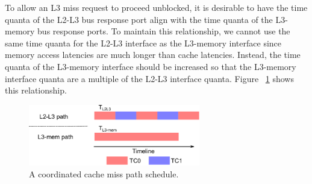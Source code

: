 To allow an L3 miss request to proceed unblocked, it is desirable to have the time 
quanta of the L2-L3 bus response port align with the time quanta of the 
L3-memory bus response ports. To maintain this relationship, we cannot use the 
same time quanta for the L2-L3 interface as the L3-memory interface since 
memory access latencies are much longer than cache latencies. Instead, the time 
quanta of the L3-memory interface should be increased so that the L3-memory 
interface quanta are a multiple of the L2-L3 interface quanta. Figure 
~\ref{fig:coordination} shows this relationship.


\begin{figure}
    \begin{center}
        \includegraphics[width=2.9475in]{figs/coordination.eps}
        \caption{A coordinated cache miss path schedule.}
        \label{fig:coordination}
    \end{center}
\end{figure}


